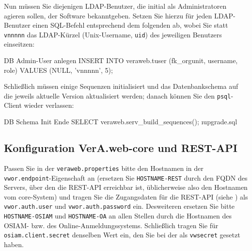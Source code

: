 \begin{minipage}{\linewidth}
Nun müssen Sie diejenigen LDAP-Benutzer, die initial als Administratoren
agieren sollen, der Software bekanntgeben. Setzen Sie hierzu für jeden
LDAP-Benutzer einen SQL-Befehl entsprechend dem folgenden ab, wobei Sie
statt \texttt{vnnnnn} das LDAP-Kürzel (Unix-Username, \texttt{uid}) des
jeweiligen Benutzers einseitzen:

\begin{lstdump}[language=SQL]{DB Admin-User anlegen}
INSERT INTO veraweb.tuser (fk_orgunit, username, role)
    VALUES (NULL, 'vnnnnn', 5);
\end{lstdump}\label{manual:db-user}
\end{minipage}

\begin{minipage}{\linewidth}
Schließlich müssen einige Sequenzen initialisiert und das Datenbankschema
auf die jeweils aktuelle Version aktualisiert werden; danach können Sie
den \texttt{psql}-Client wieder verlassen:

\begin{lstdump}{DB Schema Init Ende}
SELECT veraweb.serv_build_sequences();
\i upgrade.sql
\q
\end{lstdump}
\end{minipage}

\subsection{Konfiguration VerA.web-core und REST-API}\label{subsec:setup-core-files}

Passen Sie in der \texttt{veraweb.properties} bitte den Hostnamen
in der \texttt{vwor.endpoint}-Eigenschaft an (ersetzen Sie
\texttt{HOSTNAME-REST} durch den FQDN des Servers, über den die
REST-API erreichbar ist, üblicherweise also den Hostnamen vom
core-System) und tragen Sie die Zugangsdaten für die REST-API
(siehe ) als \texttt{vwor.auth.user}
und \texttt{vwor.auth.password} ein.
\ifoa
Desweiteren ersetzen Sie bitte \texttt{HOSTNAME-OSIAM} und
\texttt{HOSTNAME-OA} an allen Stellen durch die Hostnamen
des OSIAM- bzw. des Online-Anmeldungssystems. Schließlich
tragen Sie für \texttt{osiam.client.secret} denselben Wert
ein, den Sie bei der 
als \texttt{vwsecret} gesetzt haben.
\fi%

